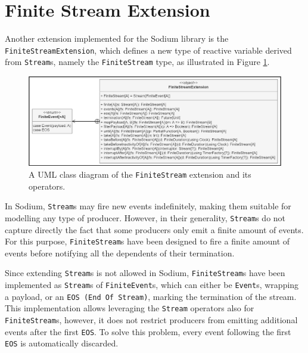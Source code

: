 
\section{Finite Stream Extension}
\label{section:implementation:finite-stream-extension}

Another extension implemented for the Sodium library is the
\texttt{FiniteStreamExten\-sion}, which defines a new type of reactive variable
derived from \texttt{Stream}s, namely the \texttt{Finite\-Stream} type, as
illustrated in Figure \ref{figure:finite-stream-extension-class-diagram}.

\begin{figure}[!ht]
  \centering
  \includegraphics[width=1\textwidth]{resources/figures/finite-stream-extension-class-diagram.png}
  \caption{
    A UML class diagram of the \texttt{FiniteStream} extension
    and its operators.
  }
  \label{figure:finite-stream-extension-class-diagram}
\end{figure}

In Sodium, \texttt{Stream}s may fire new events indefinitely, making them
suitable for modelling any type of producer. However, in their generality,
\texttt{Stream}s do not capture directly the fact that some producers only emit
a finite amount of events. For this purpose, \texttt{FiniteStream}s have been
designed to fire a finite amount of events before notifying all the dependents
of their termination.

Since extending \texttt{Stream}s is not allowed in Sodium,
\texttt{FiniteStream}s have been implemented as \texttt{Stream}s of
\texttt{FiniteEvent}s, which can either be \texttt{Event}s, wrapping a payload,
or an \texttt{EOS (End Of Stream)}, marking the termination of the stream. This
implementation allows leveraging the \texttt{Stream} operators also for
\texttt{FiniteStream}s, however, it does not restrict producers from emitting
additional events after the first \texttt{EOS}. To solve this problem, every
event following the first \texttt{EOS} is automatically discarded.

